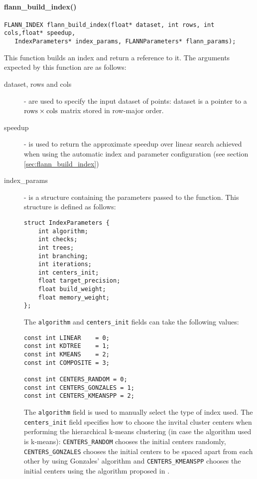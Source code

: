 \documentclass[letter,10pt]{article}
\begin{document}
\paragraph{flann\_build\_index()}
\begin{Verbatim}[fontsize=\footnotesize,frame=single]
FLANN_INDEX flann_build_index(float* dataset, int rows, int cols,float* speedup,
   IndexParameters* index_params, FLANNParameters* flann_params);
\end{Verbatim}
This function builds an index and return a reference to it. The arguments
expected by this function are as follows:
\begin{description}
 \item[dataset, rows and cols] - are used to specify the input dataset of
points: dataset is a pointer to a $\rm{rows} \times \rm{cols}$ matrix
stored in row-major order.
\item [speedup] - is used to return the approximate speedup over linear
search achieved when using the automatic index and parameter configuration
(see section \ref{sec:flann_build_index})
\item [index\_params] - is a structure containing the parameters passed to
the function. This structure is defined as follows:
\begin{Verbatim}[fontsize=\footnotesize]
struct IndexParameters {
    int algorithm;
    int checks;
    int trees;
    int branching;
    int iterations;
    int centers_init;
    float target_precision;
    float build_weight;
    float memory_weight;
};
\end{Verbatim}

The \texttt{algorithm} and \texttt{centers\_init} fields can take the
following values:
\begin{Verbatim}[fontsize=\footnotesize]
const int LINEAR    = 0;
const int KDTREE    = 1;
const int KMEANS    = 2;
const int COMPOSITE = 3;

const int CENTERS_RANDOM = 0;
const int CENTERS_GONZALES = 1;
const int CENTERS_KMEANSPP = 2;
\end{Verbatim}
The \texttt{algorithm} field is used to manually select the type of index
used. The \texttt{centers\_init} field specifies how to choose the invital
cluster centers when performing the hierarchical k-means clustering (in
case the algorithm used is k-means): \texttt{CENTERS\_RANDOM} chooses the
initial centers randomly, \texttt{CENTERS\_GONZALES} chooses the
initial centers to be spaced apart from each other by using Gonzales' algorithm
and \texttt{CENTERS\_KMEANSPP} chooses the initial centers using the algorithm
proposed in \cite{arthur_kmeanspp_2007}.


\end{description}
\end{document}

